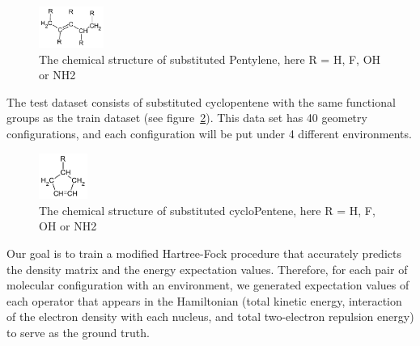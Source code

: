 \documentclass[twoside,11pt]{article}
\begin{document}
\begin{figure}[h!]
  \caption{The chemical structure of substituted Pentylene, here R = H, F, OH or NH2}
    \label{fig:molecule}
    \centerline{\includegraphics[width=80px]{pent3ene.pdf}}
\end{figure}

The test dataset consists of substituted cyclopentene  with the same functional groups as the train dataset (see figure~\ref{fig:testMolecule}). This data set has 40 geometry configurations, and each configuration will be put under 4 different environments.

\begin{figure}[h!]
  \caption{The chemical structure of substituted cycloPentene, here R = H, F, OH or NH2}
    \label{fig:testMolecule}
    \centerline{\includegraphics[width=60px]{RcycloPenteneHs.pdf}}
\end{figure}
 




Our goal is to train a modified Hartree-Fock procedure that accurately predicts the density matrix and the energy expectation values. Therefore, for each pair of molecular configuration with an environment, we generated expectation values of each operator that appears in the Hamiltonian (total kinetic energy, interaction of the electron density with each nucleus, and total two-electron repulsion energy) to serve as the ground truth. 
\end{document}
